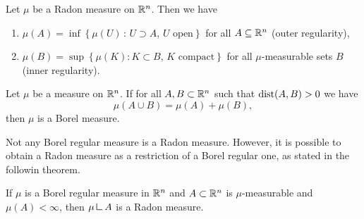 \begin{theorem}
Let $\mu$ be a Radon measure on $\mathbb{R}^n$. Then we have
\begin{enumerate}[(1)]
\item $\mu(A) = \inf\left\{ \mu(U) \,:\,
U \supset A,\, U \text{ open}\right\}$ for all $A \subseteq \mathbb{R}^n$ \hfill (outer regularity),
\item $\mu(B) = \sup \left\{ \mu (K): K \subset B,\, K \text{ compact}\right\}$ for all $\mu$-measurable sets $B$ \hfill
(inner regularity).
\end{enumerate}
\end{theorem}

\begin{theorem} \label{caratheodory_criterion}
Let $\mu$ be a measure on $\mathbb{R}^n$. If for all $A,B \subset \mathbb{R}^n$ such that $\operatorname{dist}(A,B) > 0$ we have $$\mu(A \cup B) = \mu(A) + \mu(B),$$ then $\mu$
is a Borel measure.
\end{theorem}

Not any Borel regular measure is a Radon measure. However, it is possible to obtain a Radon measure as a restriction of a Borel regular one, as stated in the followin theorem.

\begin{theorem} \label{thm:Borel_restriction_Radon}
If $\mu$ is a Borel regular measure in $\mathbb{R}^n$ and $A \subset \mathbb{R}^n$ is
$\mu$-measurable and $\mu(A) < \infty$, then $\mu \res A$ is a Radon measure. 
\end{theorem}

